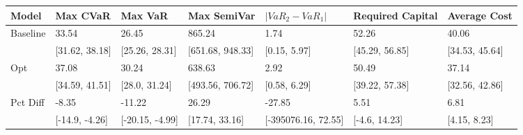 \begin{tabular}{lllllll}
\toprule
   Model &       Max CVaR &         Max VaR &      Max SemiVar &   $|VaR_2 - VaR_1|$ & Required Capital &   Average Cost \\
\midrule
Baseline &          33.54 &           26.45 &           865.24 &                1.74 &            52.26 &          40.06 \\
         & [31.62, 38.18] &  [25.26, 28.31] & [651.68, 948.33] &        [0.15, 5.97] &   [45.29, 56.85] & [34.53, 45.64] \\
     Opt &          37.08 &           30.24 &           638.63 &                2.92 &            50.49 &          37.14 \\
         & [34.59, 41.51] &   [28.0, 31.24] & [493.56, 706.72] &        [0.58, 6.29] &   [39.22, 57.38] & [32.56, 42.86] \\
Pct Diff &          -8.35 &          -11.22 &            26.29 &              -27.85 &             5.51 &           6.81 \\
         & [-14.9, -4.26] & [-20.15, -4.99] &   [17.74, 33.16] & [-395076.16, 72.55] &    [-4.6, 14.23] &   [4.15, 8.23] \\
\bottomrule
\end{tabular}
